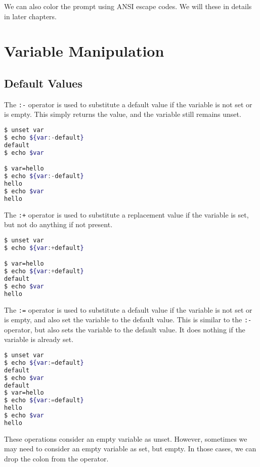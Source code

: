 We can also color the prompt using ANSI escape codes.
We will these in details in later chapters.

\section{Variable Manipulation}

\subsection{Default Values}

The \lstinline{:-} operator is used to substitute a default value if the variable is not set or is empty. This simply returns the value, and the variable still remains unset.

\begin{lstlisting}[language=bash]
$ unset var
$ echo ${var:-default}
default
$ echo $var

$ var=hello
$ echo ${var:-default}
hello
$ echo $var
hello
\end{lstlisting}

The \lstinline{:+} operator is used to substitute a replacement value if the variable is set, but not do anything if not present.

\begin{lstlisting}[language=bash]
$ unset var
$ echo ${var:+default}

$ var=hello
$ echo ${var:+default}
default
$ echo $var
hello
\end{lstlisting}

The \lstinline{:=} operator is used to substitute a default value if the variable is not set or is empty, and also set the variable to the default value.
This is similar to the \lstinline{:-} operator, but also sets the variable to the default value. It does nothing if the variable is already set.

\begin{lstlisting}[language=bash]
$ unset var
$ echo ${var:=default}
default
$ echo $var
default
$ var=hello
$ echo ${var:=default}
hello
$ echo $var
hello
\end{lstlisting}

These operations consider an empty variable as unset.
However, sometimes we may need to consider an empty variable as set, but empty.
In those cases, we can drop the colon from the operator.


